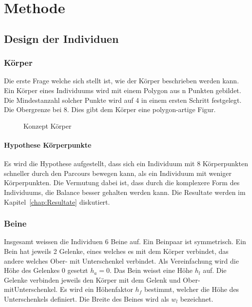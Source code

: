%
%


\chapter{Methode}

  \section{Design der Individuen}

    \subsection{Körper\label{sub:DesignBody}}

      Die erste Frage welche sich stellt ist, wie der Körper beschrieben werden kann.
      \\
      Ein Körper eines Individuums wird mit einem Polygon aus n Punkten gebildet.
      Die Mindestanzahl solcher Punkte wird auf 4 in einem ersten Schritt festgelegt.
      Die Obergrenze bei 8.
      Dies gibt dem Körper eine polygon-artige Figur.

      \begin{figure}[H]
        \centering
        
        \caption{Konzept Körper\label{fig:ConceptBodyPoints}}
      \end{figure}

      \subsubsection{Hypothese Körperpunkte\label{subsub:hypoKp}}

        Es wird die Hypothese aufgestellt,
        dass sich ein Individuum mit 8 Körperpunkten schneller durch den Parcours bewegen kann,
        als ein Individuum mit weniger Körperpunkten.
        Die Vermutung dabei ist, dass durch die komplexere Form des Individuums,
        die Balance besser gehalten werden kann.
        Die Resultate werden im Kapitel~\ref{chap:Resultate} diskutiert.

    \subsection{Beine\label{sub:Beine}}

      Insgesamt weissen die Individuen 6 Beine auf.
      Ein Beinpaar ist symmetrisch.
      Ein Bein hat jeweils 2 Gelenke, eines welches es mit dem Körper verbindet,
      das andere welches Ober- mit Unterschenkel verbindet.
      Als Vereinfachung wird die Höhe des Gelenkes 0 gesetzt \(h_{a} = 0\).
      Das Bein weisst eine Höhe \(h_{l}\) auf.
      Die Gelenke verbinden jeweils den Körper mit dem Gelenk und Ober- mitUnterschenkel.
      Es wird ein Höhenfaktor \(h_f\) bestimmt, welcher die Höhe des Unterschenkels definiert.
      Die Breite des Beines wird als \(w_{l}\) bezeichnet.

